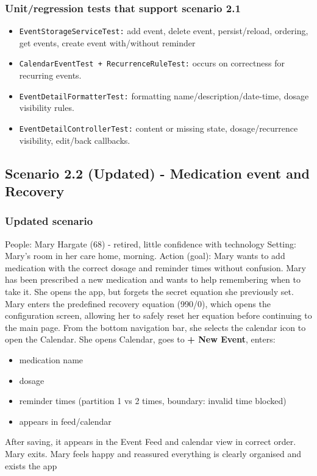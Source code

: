 \documentclass[a4paper,12pt]{article}
\begin{document}
\subsubsection{Unit/regression tests that support scenario 2.1}

\begin{itemize}
    \item \texttt{EventStorageServiceTest:} add event, delete event, persist/reload, ordering, get events,  create event with/without reminder
    \item \texttt{CalendarEventTest + RecurrenceRuleTest:} occurs on correctness for recurring events.
    \item \texttt{EventDetailFormatterTest:} formatting name/description/date-time, dosage visibility rules.
    \item \texttt{EventDetailControllerTest:} content or missing state, dosage/recurrence visibility, edit/back callbacks.
\end{itemize}

\subsection{Scenario 2.2 (Updated) - Medication event and Recovery}

\subsubsection{Updated scenario}

People: Mary Hargate (68) - retired, little confidence with technology
Setting: Mary’s room in her care home, morning.
Action (goal): Mary wants to add medication with the correct dosage and reminder times without
confusion.
Mary has been prescribed a new medication and wants to help remembering when to take it. She
opens the app, but forgets the secret equation she previously set. Mary enters the predefined recovery
equation (990/0), which opens the configuration screen, allowing her to safely reset her equation
before continuing to the main page. From the bottom navigation bar, she selects the calendar
icon to open the Calendar. She opens Calendar, goes to \textbf{+ New Event}, enters:
\begin{itemize}
    \item medication name
    \item dosage
    \item reminder times (partition 1 vs 2 times, boundary: invalid time blocked)
    \item appears in feed/calendar
\end{itemize}
After saving, it appears in the Event Feed and calendar view in correct order. Mary exits.
Mary feels happy and reassured everything is clearly organised and
exists the app
\end{document}
